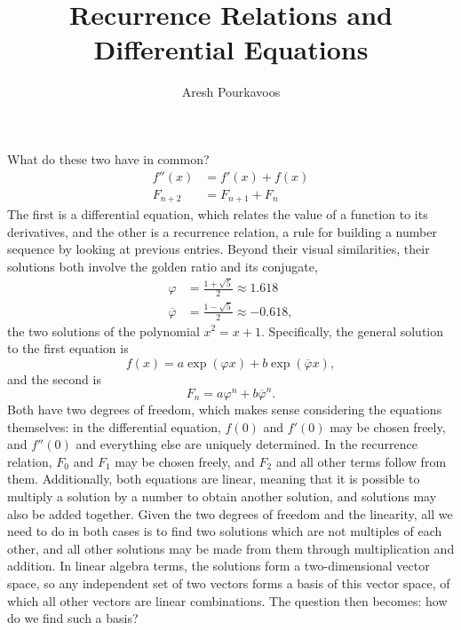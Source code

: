 \documentclass{article}
\begin{document}
\title{Recurrence Relations and Differential Equations}
\author{Aresh Pourkavoos}
\maketitle

What do these two have in common?
\begin{align*}
  f''(x) &= f'(x)+f(x) \\
  F_{n+2} &= F_{n+1}+F_n
\end{align*}
The first is a differential equation,
which relates the value of a function to its derivatives,
and the other is a recurrence relation,
a rule for building a number sequence by looking at previous entries.
Beyond their visual similarities,
their solutions both involve the golden ratio and its conjugate,
\begin{align*}
  \varphi &= \frac{1+\sqrt{5}}{2} \approx 1.618 \\
  \overline{\varphi} &= \frac{1-\sqrt{5}}{2} \approx -0.618,
\end{align*}
the two solutions of the polynomial
$x^2=x+1$.
Specifically, the general solution to the first equation is
\[f(x) = a\exp(\varphi x)+b\exp(\overline{\varphi}x),\]
and the second is
\[F_n = a\varphi^n+b\overline{\varphi}^n.\]
Both have two degrees of freedom,
which makes sense considering the equations themselves:
in the differential equation,
$f(0)$ and $f'(0)$ may be chosen freely,
and $f''(0)$ and everything else are uniquely determined.
In the recurrence relation,
$F_0$ and $F_1$ may be chosen freely,
and $F_2$ and all other terms follow from them.
Additionally, both equations are linear,
meaning that it is possible to multiply a solution by a number
to obtain another solution,
and solutions may also be added together.
Given the two degrees of freedom
and the linearity,
all we need to do in both cases
is to find two solutions
which are not multiples of each other,
and all other solutions may be made from them
through multiplication and addition.
In linear algebra terms,
the solutions form a two-dimensional vector space,
so any independent set of two vectors
forms a basis of this vector space,
of which all other vectors are linear combinations.
The question then becomes: how do we find such a basis?
\end{document}
